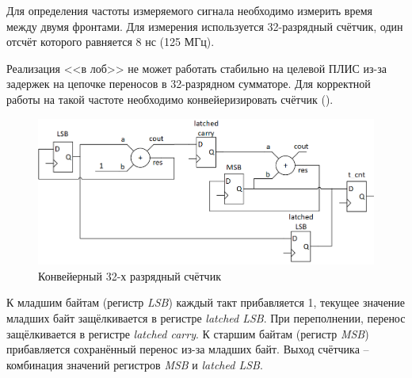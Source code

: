 Для определения частоты измеряемого сигнала необходимо измерить время между двумя фронтами.
Для измерения используется 32-разрядный счётчик, один отсчёт которого равняется 8 нс (125 МГц).

Реализация <<в лоб>> не может работать стабильно на целевой ПЛИС из-за задержек на цепочке переносов в 
32-разрядном сумматоре. Для корректной работы на такой частоте необходимо конвейеризировать счётчик ().

\begin{figure}[ht!] 
	\center
	\includegraphics [scale=0.7] {my_folder/images//t_cnt}
	\caption{Конвейерный 32-х разрядный счётчик} 
	\label{fig:t-cnt}  
\end{figure}

К младшим байтам (регистр \emph{LSB}) каждый такт прибавляется 1, текущее значение младших байт защёлкивается в регистре \emph{latched LSB}.
При переполнении, перенос защёлкивается в регистре \emph{latched carry}. К старшим байтам (регистр \emph{MSB}) прибавляется сохранённый перенос из-за
младших байт. Выход счётчика -- комбинация значений регистров \emph{MSB} и \emph{latched LSB}.

